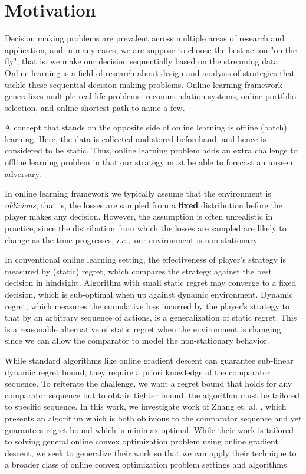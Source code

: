 \documentclass[12pt, a4paper]{report}
\begin{document}
\section{Motivation}
Decision making problems are prevalent across multiple areas of research and application, and in many cases, we are suppose to choose the best action "on the fly", that is, we make our decision sequentially based on the streaming data. Online learning is a field of research about design and analysis of strategies that tackle these sequential decision making problems. Online learning framework generalizes multiple real-life problems: recommendation systems, online portfolio selection, and online shortest path to name a few.


A concept that stands on the opposite side of online learning is offline (batch) learning. Here, the data is collected and stored beforehand, and hence is considered to be static. Thus, online learning problem adds an extra challenge to offline learning problem in that our strategy must be able to forecast an unseen adversary.

In online learning framework we typically assume that the environment is \textit{oblivious}, that is, the losses are sampled from a \textbf{fixed} distribution before the player makes any decision. However, the assumption is often unrealistic in practice, since the distribution from which the losses are sampled are likely to change as the time progresses, $i.e.,$ our environment is non-stationary. 

In conventional online learning setting, the effectiveness of player's strategy is measured by (static) regret, which compares the strategy against the best decision in hindsight. Algorithm with small static regret may converge to a fixed decision, which is sub-optimal when up against dynamic environment. Dynamic regret, which measures the cumulative loss incurred by the player's strategy to that by an arbitrary sequence of actions, is a generalization of static regret. This is a reasonable alternative of static regret when the environment is changing, since we can allow the comparator to model the non-stationary behavior. 

While standard algorithms like online gradient descent can guarantee sub-linear dynamic regret bound, they require a priori knowledge of the comparator sequence. To reiterate the challenge, we want a regret bound that holds for any comparator sequence but to obtain tighter bound, the algorithm must be tailored to specific sequence. In this work, we investigate work of Zhang et. al. \cite{Zhang2018AdaptiveOL}, which presents an algorithm which is both oblivious to the comparator sequence and yet guarantees regret bound which is minimax optimal. While their work is tailored to solving general online convex optimization problem using online gradient descent, we seek to generalize their work so that we can apply their technique to a broader class of online convex optimization problem settings and algorithms.
\end{document}
